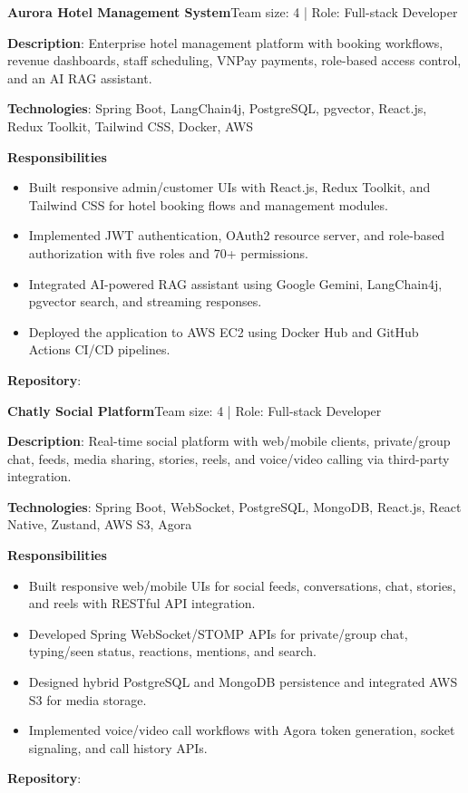   \resumeProjectHeading
    {\textbf{Aurora Hotel Management System}}{Team size: 4 | Role: Full-stack Developer}
    \resumeItemListStart
      \item \textbf{Description}: Enterprise hotel management platform with booking workflows, revenue dashboards, staff scheduling, VNPay payments, role-based access control, and an AI RAG assistant.
      \item \textbf{Technologies}: Spring Boot, LangChain4j, PostgreSQL, pgvector, React.js, Redux Toolkit, Tailwind CSS, Docker, AWS
      \item \textbf{Responsibilities}
        \begin{itemize}
          \item Built responsive admin/customer UIs with React.js, Redux Toolkit, and Tailwind CSS for hotel booking flows and management modules.
          \item Implemented JWT authentication, OAuth2 resource server, and role-based authorization with five roles and 70+ permissions.
          \item Integrated AI-powered RAG assistant using Google Gemini, LangChain4j, pgvector search, and streaming responses.
          \item Deployed the application to AWS EC2 using Docker Hub and GitHub Actions CI/CD pipelines.
        \end{itemize}
      \item \textbf{Repository}: \href{https://github.com/nvminh162/aurora-hotel-management-system}{}
    \resumeItemListEnd

  \resumeProjectHeading
    {\textbf{Chatly Social Platform}}{Team size: 4 | Role: Full-stack Developer}
    \resumeItemListStart
      \item \textbf{Description}: Real-time social platform with web/mobile clients, private/group chat, feeds, media sharing, stories, reels, and voice/video calling via third-party integration.
      \item \textbf{Technologies}: Spring Boot, WebSocket, PostgreSQL, MongoDB, React.js, React Native, Zustand, AWS S3, Agora
      \item \textbf{Responsibilities}
        \begin{itemize}
          \item Built responsive web/mobile UIs for social feeds, conversations, chat, stories, and reels with RESTful API integration.
          \item Developed Spring WebSocket/STOMP APIs for private/group chat, typing/seen status, reactions, mentions, and search.
          \item Designed hybrid PostgreSQL and MongoDB persistence and integrated AWS S3 for media storage.
          \item Implemented voice/video call workflows with Agora token generation, socket signaling, and call history APIs.
        \end{itemize}
      \item \textbf{Repository}: \href{https://github.com/nvminh162/chatly-social-platform}{}
    \resumeItemListEnd

\resumeSubHeadingListEnd
